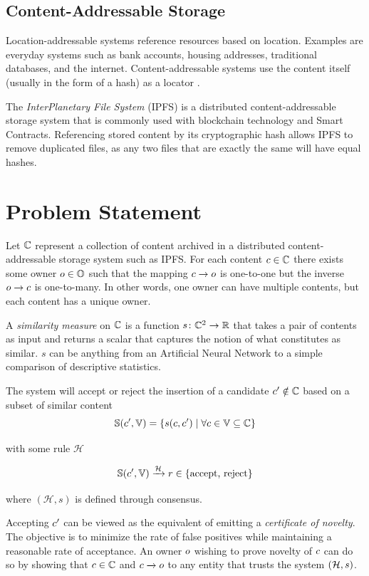 \documentclass[conference]{IEEEtran}
\begin{document}
\subsection{Content-Addressable Storage}
Location-addressable systems reference resources based on location. Examples are everyday systems such as bank accounts, housing addresses, traditional databases, and the internet. Content-addressable systems use the content itself (usually in the form of a hash) as a locator \cite{atkin2010system}.

The \emph{InterPlanetary File System} (IPFS) \cite{benet2014ipfs} is a distributed content-addressable storage system that is commonly used with blockchain technology and Smart Contracts. Referencing stored content by its cryptographic hash allows IPFS to remove duplicated files, as any two files that are exactly the same will have equal hashes.
\section{Problem Statement}
Let ${{\mathbb{C}}}$ represent a collection of content archived in a distributed content-addressable storage system such as IPFS. For each content ${c} \in {{\mathbb{C}}}$ there exists some owner ${o} \in {{\mathbb{O}}}$ such that the mapping ${c} \to {o}$ is one-to-one but the inverse ${o} \to {c}$ is one-to-many. In other words, one owner can have multiple contents, but each content has a unique owner. 

A \emph{similarity measure} on ${{\mathbb{C}}}$ is a function ${s} \colon {{\mathbb{C}}}^2 \to \mathbb{R}$ that takes a pair of contents as input and returns a scalar that captures the notion of what constitutes as similar. $s$ can be anything from an Artificial Neural Network to a simple comparison of descriptive statistics.

The system will accept or reject the insertion of a candidate ${c}^\prime \notin {{\mathbb{C}}}$ based on a subset of similar content $${\mathbb{S}}({c}^\prime, {\mathbb{V}}) = \left\{ {s}({c},{c}^\prime) \mid \forall {c} \in {\mathbb{V}} \subseteq {{\mathbb{C}}} \right\}$$

with some rule $\mathcal{H}$ 

$${\mathbb{S}}({c}^\prime, {\mathbb{V}}) \xrightarrow{\mathcal{H}} r \in \text{\{accept, reject\}}$$

where $(\mathcal{H}, s)$ is defined through consensus.

Accepting ${c}^\prime$ can be viewed as the equivalent of emitting a \emph{certificate of novelty}. The objective is to minimize the rate of false positives while maintaining a reasonable rate of acceptance. An owner ${o}$ wishing to prove novelty of ${c}$ can do so by showing that ${c} \in {{\mathbb{C}}}$ and ${c} \xrightarrow{} {o}$ to any entity that trusts the system $\left(\mathcal{H}, {s} \right)$.
\end{document}
